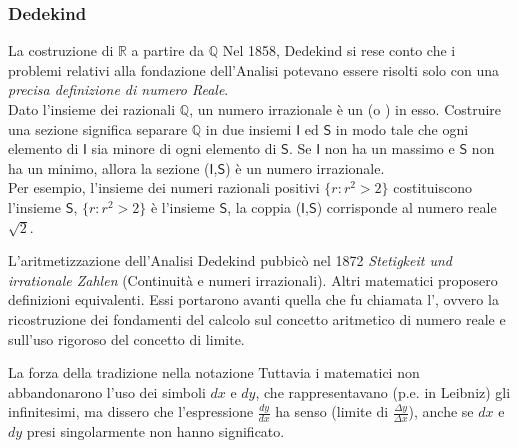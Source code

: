 \begin{frame}[label=Dedekind]
  \frametitle{Dedekind}
  \begin{block}{La costruzione di $\mathbb{R}$ a partire da $\mathbb{Q}$  }
    Nel 1858, Dedekind si rese conto che i problemi relativi alla fondazione dell'Analisi potevano essere risolti
    solo con una \textit{precisa definizione di numero Reale}.\\
    Dato l'insieme dei razionali $\mathbb{Q}$, un numero irrazionale è un  (o ) in esso.
    Costruire una sezione significa separare $\mathbb{Q}$ in due insiemi $\mathsf{I}$ ed $\mathsf{S}$ in modo tale che 
    ogni elemento di $\mathsf{I}$ sia minore di ogni elemento di $\mathsf{S}$. Se $\mathsf{I}$ non ha un massimo e 
    $\mathsf{S}$ non ha un minimo, allora la sezione ($\mathsf{I}$,$\mathsf{S}$) è un numero irrazionale.\\
    Per esempio, l'insieme dei numeri razionali positivi $\{r : r^2 > 2\}$ costituiscono l'insieme $\mathsf{S}$,
    $\{r : r^2 > 2\}$ è l'insieme $\mathsf{S}$, la coppia ($\mathsf{I}$,$\mathsf{S}$) corrisponde al numero reale $\sqrt{2}$.
  \end{block}
  \begin{block}{L'aritmetizzazione dell'Analisi}
    Dedekind pubbicò nel 1872 \textit{Stetigkeit und irrationale Zahlen} (Continuità e numeri irrazionali). Altri matematici proposero
    definizioni equivalenti. Essi portarono avanti quella che fu chiamata l', ovvero la ricostruzione
    dei fondamenti del calcolo sul concetto aritmetico di numero reale e sull'uso rigoroso del concetto di limite. 
  \end{block}

  \begin{block}{La forza della tradizione nella notazione}
    Tuttavia i matematici non abbandonarono l'uso dei simboli $dx$ e $dy$, che rappresentavano (p.e. in Leibniz) gli infinitesimi, 
    ma dissero che l'espressione $\frac{dy}{dx}$ ha senso (limite di $\frac{\Delta y}{\Delta x}$), anche se $dx$ e $dy$
    presi singolarmente non hanno significato. 
  \end{block}

\end{frame}